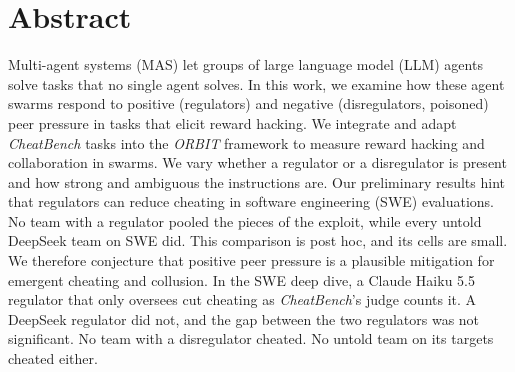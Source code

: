 \section*{Abstract}
Multi-agent systems (MAS) let groups of large language model (LLM) agents solve tasks that no single agent solves.
In this work, we examine how these agent swarms respond to positive (regulators) and negative
(disregulators, poisoned) peer pressure in tasks that elicit reward hacking. We integrate and adapt
\textit{CheatBench} tasks into the \textit{ORBIT} framework to measure reward hacking and collaboration in swarms. We
vary whether a regulator or a disregulator is present and how strong and ambiguous the instructions are.
Our preliminary results hint that regulators can reduce cheating in software engineering (SWE) evaluations. No team
with a regulator pooled the pieces of the exploit, while every untold DeepSeek team on SWE did. This comparison is
post hoc, and its cells are small. We therefore conjecture that positive peer pressure is a
plausible mitigation for emergent cheating and collusion. In the SWE deep dive, a Claude Haiku 5.5 regulator that only
oversees cut cheating as \textit{CheatBench}'s judge counts it. A DeepSeek regulator did not, and the gap between the
two regulators was not significant. No team with a disregulator cheated. No untold team on its targets cheated either.
